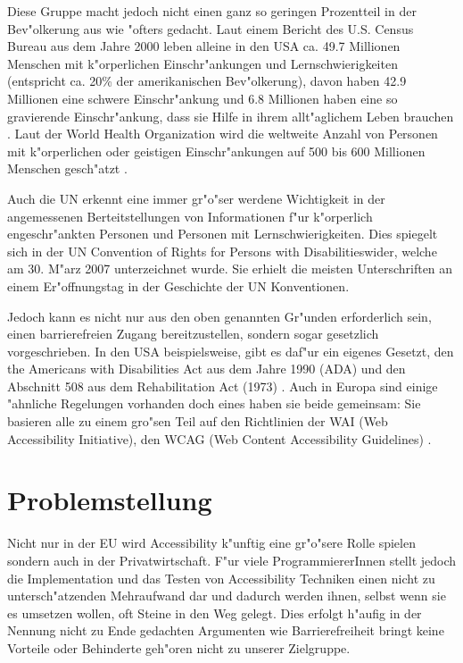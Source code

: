 \documentclass[a4paper,bibtotoc,oneside]{scrbook}
\begin{document}
Diese Gruppe macht jedoch nicht einen ganz so geringen Prozentteil in der Bev"olkerung aus wie "ofters gedacht. Laut einem Bericht des U.S. Census Bureau aus dem Jahre 2000 leben alleine in den USA ca. 49.7 Millionen Menschen mit k"orperlichen Einschr"ankungen und Lernschwierigkeiten (entspricht ca. 20\% der amerikanischen Bev"olkerung), davon haben 42.9 Millionen eine schwere Einschr"ankung und 6.8 Millionen haben eine so gravierende Einschr"ankung, dass sie Hilfe in ihrem allt"aglichem Leben brauchen \cite[S. 1]{us_cens}. Laut der World Health Organization wird die weltweite Anzahl von Personen mit k"orperlichen oder geistigen Einschr"ankungen auf 500 bis 600 Millionen Menschen gesch"atzt \cite{who_dis}.

Auch die UN erkennt eine immer gr"o"ser werdene Wichtigkeit in der angemessenen
Berteitstellungen von Informationen f"ur k"orperlich engeschr"ankten Personen und Personen mit Lernschwierigkeiten. Dies spiegelt sich in der \glqq UN Convention of Rights for Persons with Disabilities\grqq wider, welche am 30. M"arz 2007 unterzeichnet wurde. Sie erhielt die \glqq meisten Unterschriften an einem Er"offnungstag in der Geschichte der UN Konventionen\grqq \cite{un_disabilities}. 

Jedoch kann es nicht nur aus den oben genannten Gr"unden erforderlich sein,
einen barrierefreien Zugang bereitzustellen, sondern sogar gesetzlich
vorgeschrieben. In den USA beispielsweise, gibt es daf"ur ein eigenes
Gesetzt, den the Americans with Disabilities Act aus dem Jahre 1990 (ADA) und
den Abschnitt 508 aus dem Rehabilitation Act (1973) \cite[S. 288-289]{achieving_web_acc}. Auch in Europa sind einige "ahnliche Regelungen vorhanden \cite[S. 7]{mod_software} doch eines haben sie beide gemeinsam: Sie basieren alle zu einem gro"sen Teil auf den Richtlinien der WAI (Web Accessibility Initiative), den WCAG (Web Content Accessibility Guidelines) \cite[S. 289]{achieving_web_acc} \cite[S. 7]{mod_software}.

\section{Problemstellung}
Nicht nur in der EU wird Accessibility k"unftig eine gr"o"sere Rolle spielen \cite[Abschnitt EU]{w3c_pol} sondern auch in der Privatwirtschaft. F"ur viele ProgrammiererInnen stellt jedoch die Implementation und das Testen von Accessibility Techniken einen nicht zu untersch"atzenden Mehraufwand dar \cite[S. 27]{understand_acc} und dadurch werden ihnen, selbst wenn sie es umsetzen wollen, oft Steine in den Weg gelegt. Dies erfolgt h"aufig in der Nennung nicht zu Ende gedachten Argumenten wie \glqq Barrierefreiheit bringt keine Vorteile\grqq \cite[S. 28]{understand_acc} oder \glqq Behinderte geh"oren nicht zu unserer Zielgruppe\grqq \cite[S. 31]{understand_acc}.
\end{document}

